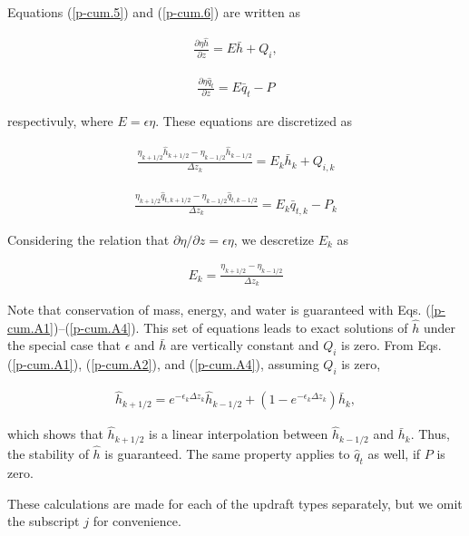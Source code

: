Equations (\ref{p-cum.5}) and (\ref{p-cum.6}) are written as

\begin{eqnarray}
 \frac{\partial \eta \hat{h}}{\partial z} = E \bar{h} + Q_i,
\end{eqnarray}

\begin{eqnarray}
 \frac{\partial \eta \hat{q}_t}{\partial z} = E \bar{q}_t -P
\end{eqnarray}

respectivuly, where \(E = \epsilon\eta\). These equations are
discretized as

\begin{eqnarray}
 \frac{\eta_{k+1/2} \hat{h}_{k+1/2} - \eta_{k-1/2} \hat{h}_{k-1/2}}{\Delta z_k} = E_k \bar{h}_k + {Q_{i,k}}  \label{p-cum.A2}
\end{eqnarray}

\begin{eqnarray}
 \frac{\eta_{k+1/2} \hat{q}_{t,k+1/2} - \eta_{k-1/2} \hat{q}_{t,k-1/2}}{\Delta z_k} = E_k {\bar{q}_{t,k}} - P_k  \label{p-cum.A3}
\end{eqnarray}

Considering the relation that
\(\partial \eta/\partial z = \epsilon\eta\), we descretize \(E_k\) as

\begin{eqnarray}
 E_k = \frac{\eta_{k+1/2} - \eta_{k-1/2}}{\Delta z_k}  \label{p-cum.A4}
\end{eqnarray}

Note that conservation of mass, energy, and water is guaranteed with
Eqs. (\ref{p-cum.A1})--(\ref{p-cum.A4}). This set of equations
leads to exact solutions of \(\hat{h}\) under the special case that
\(\epsilon\) and \(\bar{h}\) are vertically constant and \(Q_i\) is
zero. From Eqs. (\ref{p-cum.A1}), (\ref{p-cum.A2}), and
(\ref{p-cum.A4}), assuming \(Q_i\) is zero,

\begin{eqnarray}
 \hat{h}_{k+1/2} = e^{-\epsilon_k \Delta z_k} \hat{h}_{k - 1/2} + (1 - e^{-\epsilon_k \Delta z_k}) \bar{h}_k,
\end{eqnarray}

which shows that \(\hat{h}_{k+1/2}\) is a linear interpolation between
\(\hat{h}_{k - 1/2}\) and \(\bar{h}_k\). Thus, the stability of
\(\hat{h}\) is guaranteed. The same property applies to \(\hat{q}_t\) as
well, if \(P\) is zero.

These calculations are made for each of the updraft types separately,
but we omit the subscript \(j\) for convenience.

